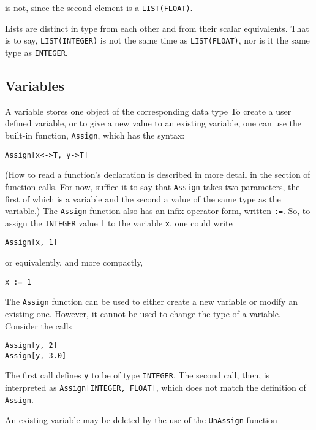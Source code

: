 \noindent is not, since the second element is a {\tt LIST(FLOAT)}.

Lists are distinct in type from each other and from their scalar equivalents.
That is to say, {\tt LIST(INTEGER)} is not the same time as
{\tt LIST(FLOAT)}, nor is it the same type as {\tt INTEGER}.

\subsection{Variables}

A variable stores one object of the corresponding data type
To create a user defined variable, or to give
a new value to an existing variable, one can use the built-in
function,
\verb+Assign+, which has the syntax:
\begin{verbatim}
Assign[x<->T, y->T]
\end{verbatim}

\noindent (How to read a function's declaration is described in more
detail in the section of function calls.  For now, suffice it to say that
{\tt Assign} takes two parameters, the first of which is a variable and
the second a value of the same type as the variable.)  The {\tt Assign}
function also has an infix operator form, written {\tt :=}.  So, to assign
the {\tt INTEGER} value 1 to the variable {\tt x}, one could write

\begin{verbatim}
Assign[x, 1]
\end{verbatim}

\noindent or equivalently, and more compactly,

\begin{verbatim}
x := 1
\end{verbatim}

The {\tt Assign} function can be used to either create a new variable or
modify an existing one.  However, it cannot be used to change the type
of a variable.  Consider the calls

\begin{verbatim}
Assign[y, 2]
Assign[y, 3.0]
\end{verbatim}

\noindent The first call defines {\tt y} to be of type {\tt INTEGER}.  The
second call, then, is interpreted as {\tt Assign[INTEGER, FLOAT]}, which does
not match the definition of {\tt Assign}.

An existing variable may be deleted by the use of the {\tt UnAssign} function

